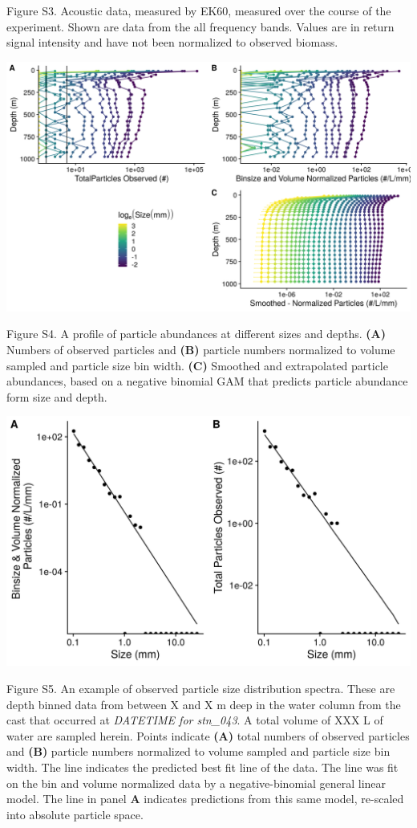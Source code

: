 \documentclass[]{article}
\begin{document}
Figure S3. Acoustic data, measured by EK60, measured over the course of
the experiment. Shown are data from the all frequency bands. Values are
in return signal intensity and have not been normalized to observed
biomass.

\includegraphics{../figures/AllParticleSizes.png}

Figure S4. A profile of particle abundances at different sizes and
depths. \textbf{(A)} Numbers of observed particles and \textbf{(B)}
particle numbers normalized to volume sampled and particle size bin
width. \textbf{(C)} Smoothed and extrapolated particle abundances, based
on a negative binomial GAM that predicts particle abundance form size
and depth.

\includegraphics{../figures/ExamplePSD163m.png}

Figure S5. An example of observed particle size distribution spectra.
These are depth binned data from between X and X m deep in the water
column from the cast that occurred at \emph{DATETIME for stn\_043}. A
total volume of XXX L of water are sampled herein. Points indicate
\textbf{(A)} total numbers of observed particles and \textbf{(B)}
particle numbers normalized to volume sampled and particle size bin
width. The line indicates the predicted best fit line of the data. The
line was fit on the bin and volume normalized data by a
negative-binomial general linear model. The line in panel \textbf{A}
indicates predictions from this same model, re-scaled into absolute
particle space.
\end{document}
